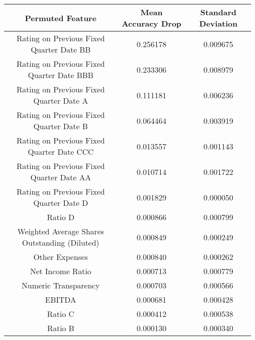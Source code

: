 \tiny
\begin{tabular}{ccc}
\toprule
Permuted Feature & Mean Accuracy Drop & Standard Deviation \\
\midrule
Rating on Previous Fixed Quarter Date BB & 0.256178 & 0.009675 \\
Rating on Previous Fixed Quarter Date BBB & 0.233306 & 0.008979 \\
Rating on Previous Fixed Quarter Date A & 0.111181 & 0.006236 \\
Rating on Previous Fixed Quarter Date B & 0.064464 & 0.003919 \\
Rating on Previous Fixed Quarter Date CCC & 0.013557 & 0.001143 \\
Rating on Previous Fixed Quarter Date AA & 0.010714 & 0.001722 \\
Rating on Previous Fixed Quarter Date D & 0.001829 & 0.000050 \\
Ratio D & 0.000866 & 0.000799 \\
Weighted Average Shares Outstanding (Diluted) & 0.000849 & 0.000249 \\
Other Expenses & 0.000840 & 0.000262 \\
Net Income Ratio & 0.000713 & 0.000779 \\
Numeric Transparency & 0.000703 & 0.000566 \\
EBITDA & 0.000681 & 0.000428 \\
Ratio C & 0.000412 & 0.000538 \\
Ratio B & 0.000130 & 0.000340 \\
\bottomrule
\end{tabular}

\normalsize